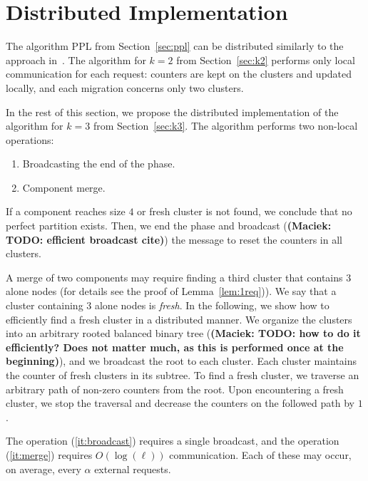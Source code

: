\documentclass[manuscript,screen=true, review, anonymous]{acmart}
\newcommand\maciek[1]{\color{brown}\textbf{(Maciek: #1)}\color{black}}
\begin{document}
\section{Distributed Implementation}
The algorithm PPL from Section~\ref{sec:ppl} can be distributed
similarly to the approach in~\cite{sigmetrics19_partitioning}.
The algorithm for $k=2$ from Section~\ref{sec:k2} performs only local communication for each request: counters are kept on the clusters and updated locally, and each migration concerns only two clusters.
\medskip

In the rest of this section, we propose the distributed implementation of the algorithm for $k=3$ from Section~\ref{sec:k3}.
The algorithm performs two non-local operations:
\begin{enumerate}
	\item Broadcasting the end of the phase.\label{it:broadcast}
	\item Component merge.
	\label{it:merge}
\end{enumerate}

If a component reaches size $4$ or fresh cluster is not found, we conclude that no perfect partition exists.
Then, we end the phase and broadcast (\maciek{TODO: efficient broadcast cite}) the message to  reset the counters in all clusters.

A merge of two components may require finding a third cluster that contains $3$ alone nodes (for details see the proof of Lemma~\ref{lem:1req})).
We say that a cluster containing $3$ alone nodes is \emph{fresh}.
In the following, we show how to efficiently find a fresh cluster in a distributed manner.
We organize the clusters into an arbitrary rooted balanced binary tree (\maciek{TODO: how to do it efficiently? Does not matter much, as this is performed once at the beginning}), and we broadcast the root to each cluster.
Each cluster maintains the counter of fresh clusters in its subtree.
To find a fresh cluster, we traverse an arbitrary path of non-zero counters from the root.
Upon encountering a fresh cluster, we stop the traversal and decrease the counters on the followed path by $1$.

The operation (\ref{it:broadcast}) requires a single broadcast, and the operation (\ref{it:merge}) requires $O(\log(\ell))$ communication.
Each of these may occur, on average, every $\alpha$ external requests.



  

\appendix
\end{document}

